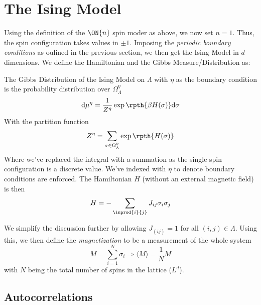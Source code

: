 	\section{The Ising Model}
	Using the definition of the $\ON{n}$ spin moder as above, we now set $n=1$. Thus, the spin 
	configuration takes values in $\pm 1$. Imposing the \textit{periodic boundary conditions} as oulined 
	in the previous section, we then get the Ising Model in $d$ dimensions. We define the Hamiltonian and
	the Gibbs Measure/Distribution as:
	\begin{ndefi}
		The Gibbs Distribution of the Ising Model on $\Lambda$ with $\eta$ as the boundary condition is
		the probability distribution over $\Omega_\Lambda^\eta$
		\[ \mathrm{d}\mu^{\eta} = \frac{1}{Z^{\eta}} \exp \rpth{\beta H(\sigma)} 
			\mathrm{d}\sigma \]
		With the partition function 
		\[ Z^\eta = \sum_{\sigma \in \Omega_\Lambda^\eta} \exp \rpth{H(\sigma)} \]
		Where we've replaced the integral with a summation as the single spin configuration
		is a discrete value. We've indexed with $\eta$ to denote boundary conditions are enforced. 
		The Hamiltonian $H$ (without an external magnetic field) is then 
		\[H = -\sum_{\inprod{i}{j}} J_{ij} \sigma_i \sigma_j  \]
	\end{ndefi}

	We simplify the discussion further by allowing $J_{(ij)} = 1$ for all $(i,j) \in \Lambda$. Using
	this, we then define the \textit{magnetization} to be a measurement of the whole system 
		\begin{equation}
			M = \sum_{i=1}^N \sigma_i \Rightarrow \langle M \rangle = \frac{1}{N} M
		\end{equation}
	with $N$ being the total number of spins in the lattice ($L^{d}$). 

	\subsection{Autocorrelations}




